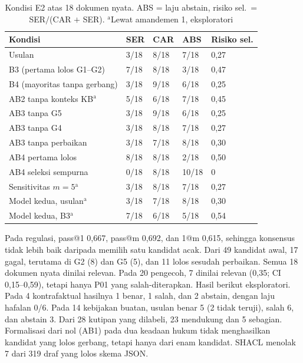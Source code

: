 \documentclass[conference]{IEEEtran}
\makeatletter
\DeclareRobustCommand{\en}[1]{{\usefont{\f@encoding}{\f@family}{\f@series}{it}#1\/}}
\makeatother
\begin{document}
\begin{table}[t]
\centering
\caption{Kondisi E2 atas 18 dokumen nyata. ABS = laju \en{abstain}, risiko sel.\ = SER$/$(CAR $+$ SER). $^{\mathrm{a}}$Lewat amandemen 1, eksploratori}
\label{tab:e2}
\scriptsize
\setlength{\tabcolsep}{3pt}
\begin{tabularx}{\columnwidth}{@{}L P{0.75cm} P{0.75cm} P{0.75cm} P{1.1cm}@{}}
\toprule
\textbf{Kondisi} & \textbf{SER} & \textbf{CAR} & \textbf{ABS} & \textbf{Risiko sel.} \\
\midrule
Usulan & 3/18 & 8/18 & 7/18 & 0,27 \\
B3 (pertama lolos G1--G2) & 7/18 & 8/18 & 3/18 & 0,47 \\
B4 (mayoritas tanpa gerbang) & 3/18 & 9/18 & 6/18 & 0,25 \\
AB2 tanpa konteks KB$^{\mathrm{a}}$ & 5/18 & 6/18 & 7/18 & 0,45 \\
AB3 tanpa G5 & 3/18 & 9/18 & 6/18 & 0,25 \\
AB3 tanpa G4 & 3/18 & 8/18 & 7/18 & 0,27 \\
AB3 tanpa perbaikan & 3/18 & 7/18 & 8/18 & 0,30 \\
AB4 pertama lolos & 8/18 & 8/18 & 2/18 & 0,50 \\
AB4 seleksi sempurna & 0/18 & 8/18 & 10/18 & 0 \\
Sensitivitas $m = 5$$^{\mathrm{a}}$ & 3/18 & 8/18 & 7/18 & 0,27 \\
Model kedua, usulan$^{\mathrm{a}}$ & 3/18 & 7/18 & 8/18 & 0,30 \\
Model kedua, B3$^{\mathrm{a}}$ & 7/18 & 6/18 & 5/18 & 0,54 \\
\bottomrule
\end{tabularx}
\end{table}

Pada regulasi, \en{pass@1} 0,667, \en{pass@m} 0,692, dan \en{1@m} 0,615, sehingga konsensus tidak lebih baik daripada memilih satu kandidat acak. Dari 49 kandidat awal, 17 gagal, terutama di G2 (8) dan G5 (5), dan 11 lolos sesudah perbaikan. Semua 18 dokumen nyata dinilai relevan. Pada 20 pengecoh, 7 dinilai relevan (0,35; CI 0,15--0,59), tetapi hanya P01 yang salah-diterapkan. Hasil berikut eksploratori. Pada 4 kontrafaktual hasilnya 1 benar, 1 salah, dan 2 \en{abstain}, dengan laju hafalan 0/6. Pada 14 kebijakan buatan, usulan benar 5 (2 tidak teruji), salah 6, dan \en{abstain} 3. Dari 28 kutipan yang dilabeli, 23 mendukung dan 5 sebagian. Formalisasi dari nol (AB1) pada dua keadaan hukum tidak menghasilkan kandidat yang lolos gerbang, tetapi hanya dari enam kandidat. SHACL menolak 7 dari 319 draf yang lolos skema JSON.
\end{document}
